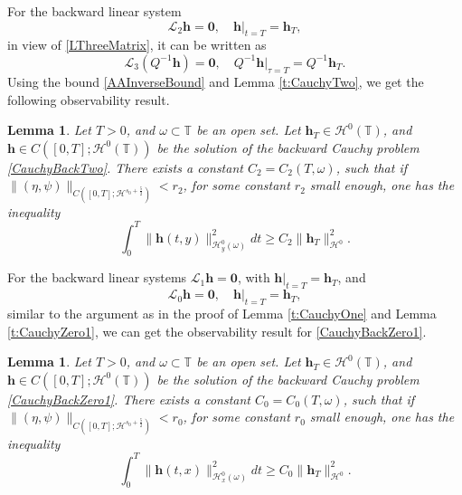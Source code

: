 \documentclass[12pt]{amsart}
\newtheorem{lemma}[theorem]{Lemma}
\theoremstyle{remark}
\theoremstyle{definition}
\numberwithin{equation}{section}
\renewcommand{\H}{{\mathcal H }}
\newcommand{\f}{\frac}
\newcommand{\T}{{\mathbb T}}
\newcommand{\mL}{\mathcal{L}}
\begin{document}
For the backward linear system 
\begin{equation} \label{CauchyBackTwo}
  \mL_2  \mathbf{h} = \mathbf{0}, \quad \mathbf{h}|_{t=T} = \mathbf{h}_{T},
\end{equation}
in view of \eqref{LThreeMatrix}, it can be written as
\begin{equation*} 
\mL_3 (Q^{-1}\mathbf{h}) = \mathbf{0}, \quad Q^{-1}\mathbf{h}|_{\tau=T} = Q^{-1}\mathbf{h}_{T}.
 \end{equation*}
Using the bound \eqref{AAInverseBound} and Lemma \ref{t:CauchyTwo}, we get the following observability result.
\begin{lemma} \label{t:ObserveTwo}
Let $T>0$, and $\omega \subset \T$ be an open set.
Let $\textbf{h}_T \in \H^0(\T)$, and $\textbf{h} \in C([0,T]; \H^0(\T))$ be the solution of the backward Cauchy problem \eqref{CauchyBackTwo}.
There exists a constant $C_2 = C_2(T,\omega)$, such that if $\| (\eta, \psi)\|_{C([0,T]; \H^{s_0 +\f52})}< r_2$, for some constant $r_2$ small enough, one has the inequality  
\begin{equation}\label{ObserveTwo}
    \int_0^T \|\mathbf{h}(t,y)\|_{\H^0_y(\omega)}^2 dt \geq C_2\| \mathbf{h}_{T}\|_{\H^0}^2.
\end{equation}
\end{lemma}

For the backward linear systems $\mL_1 \mathbf{h} = \mathbf{0}$, with $\mathbf{h}|_{t=T} = \mathbf{h}_{T}$, and
\begin{equation} \label{CauchyBackZero1}
  \mL_0 \mathbf{h} = \mathbf{0}, \quad \mathbf{h}|_{t=T} = \mathbf{h}_{T},
\end{equation}
similar to the argument as in the proof of Lemma \ref{t:CauchyOne} and Lemma \ref{t:CauchyZero1}, we can get the observability result for \eqref{CauchyBackZero1}. 
\begin{lemma} \label{t:ObserveZero1}
Let $T>0$, and $\omega \subset \T$ be an open set.
Let $\textbf{h}_T \in \H^0(\T)$, and $\textbf{h} \in C([0,T]; \H^0(\T))$ be the solution of the backward Cauchy problem \eqref{CauchyBackZero1}.
There exists a constant $C_0 = C_0(T,\omega)$, such that if $\| (\eta, \psi)\|_{C([0,T]; \H^{s_0 +\f52})}< r_0$, for some constant $r_0$ small enough, one has the inequality  
\begin{equation}\label{ObserveZero1}
    \int_0^T \|\mathbf{h}(t,x)\|_{\H^0_x(\omega)}^2 dt \geq C_0\| \mathbf{h}_{T}\|_{\H^0}^2.
\end{equation}
\end{lemma}
\end{document}

